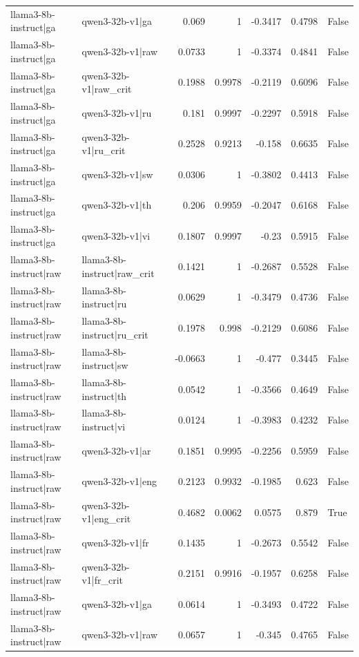 \begin{table}
\begin{tabular}{l l r r r r l}
llama3-8b-instruct|ga & qwen3-32b-v1|ga & 0.069 & 1 & -0.3417 & 0.4798 & False \\
llama3-8b-instruct|ga & qwen3-32b-v1|raw & 0.0733 & 1 & -0.3374 & 0.4841 & False \\
llama3-8b-instruct|ga & qwen3-32b-v1|raw_crit & 0.1988 & 0.9978 & -0.2119 & 0.6096 & False \\
llama3-8b-instruct|ga & qwen3-32b-v1|ru & 0.181 & 0.9997 & -0.2297 & 0.5918 & False \\
llama3-8b-instruct|ga & qwen3-32b-v1|ru_crit & 0.2528 & 0.9213 & -0.158 & 0.6635 & False \\
llama3-8b-instruct|ga & qwen3-32b-v1|sw & 0.0306 & 1 & -0.3802 & 0.4413 & False \\
llama3-8b-instruct|ga & qwen3-32b-v1|th & 0.206 & 0.9959 & -0.2047 & 0.6168 & False \\
llama3-8b-instruct|ga & qwen3-32b-v1|vi & 0.1807 & 0.9997 & -0.23 & 0.5915 & False \\
llama3-8b-instruct|raw & llama3-8b-instruct|raw_crit & 0.1421 & 1 & -0.2687 & 0.5528 & False \\
llama3-8b-instruct|raw & llama3-8b-instruct|ru & 0.0629 & 1 & -0.3479 & 0.4736 & False \\
llama3-8b-instruct|raw & llama3-8b-instruct|ru_crit & 0.1978 & 0.998 & -0.2129 & 0.6086 & False \\
llama3-8b-instruct|raw & llama3-8b-instruct|sw & -0.0663 & 1 & -0.477 & 0.3445 & False \\
llama3-8b-instruct|raw & llama3-8b-instruct|th & 0.0542 & 1 & -0.3566 & 0.4649 & False \\
llama3-8b-instruct|raw & llama3-8b-instruct|vi & 0.0124 & 1 & -0.3983 & 0.4232 & False \\
llama3-8b-instruct|raw & qwen3-32b-v1|ar & 0.1851 & 0.9995 & -0.2256 & 0.5959 & False \\
llama3-8b-instruct|raw & qwen3-32b-v1|eng & 0.2123 & 0.9932 & -0.1985 & 0.623 & False \\
llama3-8b-instruct|raw & qwen3-32b-v1|eng_crit & 0.4682 & 0.0062 & 0.0575 & 0.879 & True \\
llama3-8b-instruct|raw & qwen3-32b-v1|fr & 0.1435 & 1 & -0.2673 & 0.5542 & False \\
llama3-8b-instruct|raw & qwen3-32b-v1|fr_crit & 0.2151 & 0.9916 & -0.1957 & 0.6258 & False \\
llama3-8b-instruct|raw & qwen3-32b-v1|ga & 0.0614 & 1 & -0.3493 & 0.4722 & False \\
llama3-8b-instruct|raw & qwen3-32b-v1|raw & 0.0657 & 1 & -0.345 & 0.4765 & False \\

\end{tabular}
\end{table}
